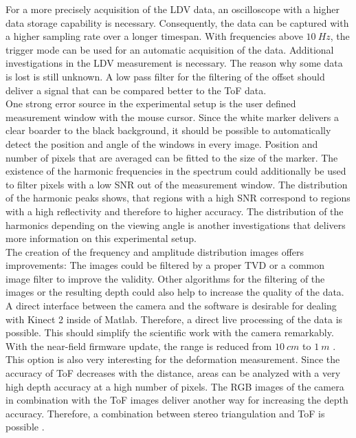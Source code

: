 For a more precisely acquisition of the LDV data, an oscilloscope with a higher data storage capability is necessary. Consequently, the data can be captured with a higher sampling rate over a longer timespan. With frequencies above $10~Hz$, the trigger mode can be used for an automatic acquisition of the data. Additional investigations in the LDV measurement is necessary. The reason why some data is lost is still unknown. A low pass filter for the filtering of the offset should deliver a signal that can be compared better to the ToF data.\\ 

One strong error source in the experimental setup is the user defined measurement window with the mouse cursor. Since the white marker delivers a clear boarder to the black background, it should be possible to automatically detect the position and angle of the windows in every image. Position and number of pixels that are averaged can be fitted to the size of the marker. The existence of the harmonic frequencies in the spectrum could additionally be used to filter pixels with a low SNR out of the measurement window. The distribution of the harmonic peaks shows, that regions with a high SNR correspond to regions with a high reflectivity and therefore to higher accuracy. The distribution of the harmonics depending on the viewing angle is another investigations that delivers more information on this experimental setup.\\

The creation of the frequency and amplitude distribution images offers improvements: The images could be filtered by a proper TVD or a common image filter to improve the validity. Other algorithms for the filtering of the images or the resulting depth could also help to increase the quality of the data.\\  

A direct interface between the camera and the software is desirable for dealing with Kinect 2 inside of Matlab. Therefore, a direct live processing of the data is possible. This should simplify the scientific work with the camera remarkably. With the near-field firmware update, the range is reduced from $10~cm$ to $1~m$ \cite{nearfieldKinect}. This option is also very interesting for the deformation measurement. Since the accuracy of ToF decreases with the distance, areas can be analyzed with a very high depth accuracy at a high number of pixels. The RGB images of the camera in combination with the ToF images deliver another way for increasing the depth accuracy. Therefore, a combination between stereo triangulation and ToF is possible \cite{dal2010probabilistic}.    
\newpage

